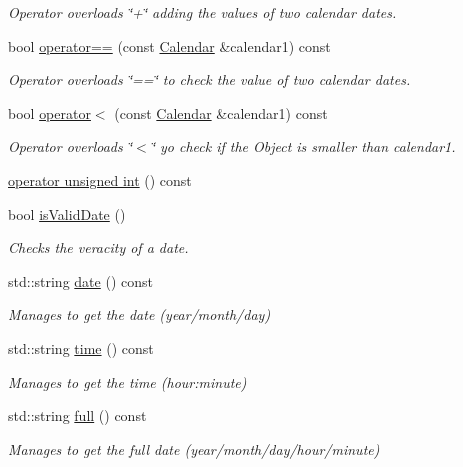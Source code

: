 \begin{DoxyCompactItemize}
\begin{DoxyCompactList}\small\item\em Operator overloads \char`\"{}+\char`\"{} adding the values of two calendar dates. \end{DoxyCompactList}\item 
bool \hyperlink{class_calendar_a25fdea266ecbfdf5e5dc0bde770b51c0}{operator==} (const \hyperlink{class_calendar}{Calendar} \&calendar1) const
\begin{DoxyCompactList}\small\item\em Operator overloads \char`\"{}==\char`\"{} to check the value of two calendar dates. \end{DoxyCompactList}\item 
bool \hyperlink{class_calendar_ab701051dc424c48d6f423cdf0bca6ad4}{operator$<$} (const \hyperlink{class_calendar}{Calendar} \&calendar1) const
\begin{DoxyCompactList}\small\item\em Operator overloads \char`\"{}$<$\char`\"{} yo check if the Object is smaller than calendar1. \end{DoxyCompactList}\item 
\hyperlink{class_calendar_a70f6e6b4f62dcca5c05bd9341d288b0a}{operator unsigned int} () const
\item 
bool \hyperlink{class_calendar_a5b30c644c6a7bf69c541c14fc7c4e47d}{is\+Valid\+Date} ()
\begin{DoxyCompactList}\small\item\em Checks the veracity of a date. \end{DoxyCompactList}\item 
std\+::string \hyperlink{class_calendar_a00249de42fc112c379f4bf139e77dd54}{date} () const
\begin{DoxyCompactList}\small\item\em Manages to get the date (year/month/day) \end{DoxyCompactList}\item 
std\+::string \hyperlink{class_calendar_ae8d5a30e386a154991cf0e32f7af4b2c}{time} () const
\begin{DoxyCompactList}\small\item\em Manages to get the time (hour\+:minute) \end{DoxyCompactList}\item 
std\+::string \hyperlink{class_calendar_a05c05a05e460dd25ce4a5bf1b8ae0ed8}{full} () const
\begin{DoxyCompactList}\small\item\em Manages to get the full date (year/month/day/hour/minute) \end{DoxyCompactList}\end{DoxyCompactItemize}
